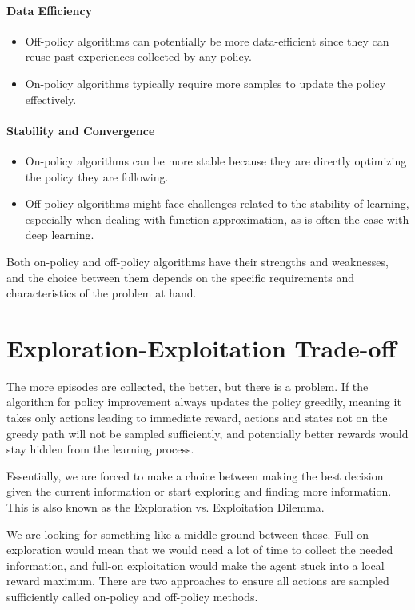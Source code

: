 \paragraph{Data Efficiency}
\begin{itemize}
	\item Off-policy algorithms can potentially be more data-efficient since they can reuse past experiences collected by any policy.
	\item On-policy algorithms typically require more samples to update the policy effectively.
\end{itemize}
    
\paragraph{Stability and Convergence}
\begin{itemize}
	\item On-policy algorithms can be more stable because they are directly optimizing the policy they are following.
	\item Off-policy algorithms might face challenges related to the stability of learning, especially when dealing with function approximation, as is often the case with deep learning.
\end{itemize}
    
Both on-policy and off-policy algorithms have their strengths and weaknesses, and the choice between them depends on the specific requirements and characteristics of the problem at hand.

\section{Exploration-Exploitation Trade-off}
The more episodes are collected, the better, but there is a problem. If the algorithm for policy improvement always updates the policy greedily, meaning it takes only actions leading to immediate reward, actions and states not on the greedy path will not be sampled sufficiently, and potentially better rewards would stay hidden from the learning process.

Essentially, we are forced to make a choice between making the best decision given the current information or start exploring and finding more information. This is also known as the Exploration vs. Exploitation Dilemma.

We are looking for something like a middle ground between those. Full-on exploration would mean that we would need a lot of time to collect the needed information, and full-on exploitation would make the agent stuck into a local reward maximum. There are two approaches to ensure all actions are sampled sufficiently called on-policy and off-policy methods.



